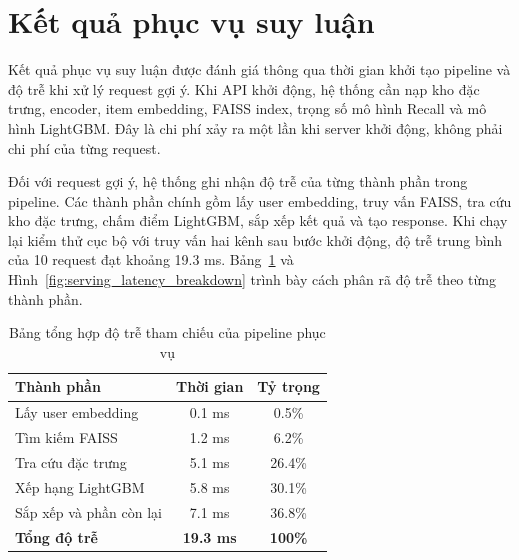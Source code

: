 \section{Kết quả phục vụ suy luận}
Kết quả phục vụ suy luận được đánh giá thông qua thời gian khởi tạo pipeline và độ trễ khi xử lý request gợi ý. Khi API khởi động, hệ thống cần nạp kho đặc trưng, encoder, item embedding, FAISS index, trọng số mô hình Recall và mô hình LightGBM. Đây là chi phí xảy ra một lần khi server khởi động, không phải chi phí của từng request.
\medskip

Đối với request gợi ý, hệ thống ghi nhận độ trễ của từng thành phần trong pipeline. Các thành phần chính gồm lấy user embedding, truy vấn FAISS, tra cứu kho đặc trưng, chấm điểm LightGBM, sắp xếp kết quả và tạo response. Khi chạy lại kiểm thử cục bộ với truy vấn hai kênh sau bước khởi động, độ trễ trung bình của 10 request đạt khoảng 19.3 ms. Bảng~\ref{tab:serving_latency} và Hình~\ref{fig:serving_latency_breakdown} trình bày cách phân rã độ trễ theo từng thành phần.

\begin{table}[H]
\centering
\caption{Bảng tổng hợp độ trễ tham chiếu của pipeline phục vụ}
\label{tab:serving_latency}
\renewcommand{\arraystretch}{1.25}
\small
\begin{tabularx}{\textwidth}{Xcc}
\toprule
\textbf{Thành phần} & \textbf{Thời gian} & \textbf{Tỷ trọng} \\
\midrule
Lấy user embedding & 0.1 ms & 0.5\% \\
Tìm kiếm FAISS & 1.2 ms & 6.2\% \\
Tra cứu đặc trưng & 5.1 ms & 26.4\% \\
Xếp hạng LightGBM & 5.8 ms & 30.1\% \\
Sắp xếp và phần còn lại & 7.1 ms & 36.8\% \\
\midrule
\textbf{Tổng độ trễ} & \textbf{19.3 ms} & \textbf{100\%} \\
\bottomrule
\end{tabularx}
\end{table}

